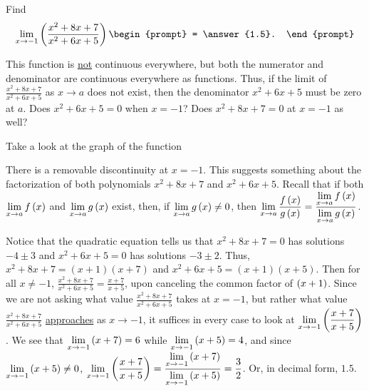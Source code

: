 \documentclass{ximera}
\author{Gregory Hartman \and Matthew Carr}
\begin{document}
\begin{exercise}



  Find 
  \[
  \lim_{x\to-1}\p{ \frac{x^2+8x+7}{x^2+6x+5}}
  \begin{prompt}
  = \answer{1.5}.
  \end{prompt}
  \]
    \begin{hint}
      This function is \underline{not} continuous everywhere, but both the numerator and denominator are continuous everywhere as functions. Thus, if the limit of $\frac{x^2+8x+7}{x^2+6x+5}$ as $x\to{a}$ does not exist, then the denominator $x^2+6x+5$ must be zero at $a$. Does $x^2+6x+5=0$ when $x=-1$? Does $x^2+8x+7=0$ at $x=-1$ as well?
    \end{hint}
     \begin{hint}
    Take a look at the graph of the function
    \begin{center}
      \end{center}
      There is a removable discontinuity at $x=-1$. This suggests something about the factorization of both polynomials $x^2+8x+7$ and $x^2+6x+5$. Recall that if both $\lim_{x\to a}f\p{x}$ and $\lim_{x\to a}g\p{x}$ exist, then, if $\lim_{x\to a}g\p{x}\ne0$, then $\lim_{x\to a}\frac{f\p{x}}{g\p{x}}=\frac{\lim_{x\to a}f\p{x}}{\lim_{x\to a}g\p{x}}$.
    \end{hint}
    \begin{hint}
     Notice that the quadratic equation tells us that $x^2+8x+7=0$ has solutions $-4\pm3$ and $x^2+6x+5=0$ has solutions $-3\pm{2}$. Thus, $x^2+8x+7=\left(x+1\right)\left(x+7\right)$ and $x^2+6x+5=\left(x+1\right)\left(x+5\right)$. Then for all $x\ne-1$, $\frac{x^2+8x+7}{x^2+6x+5}=\frac{x+7}{x+5}$, upon canceling the common factor of $\left(x+1\right)$. Since we are not asking what value $\frac{x^2+8x+7}{x^2+6x+5}$ takes at $x=-1$, but rather what value $\frac{x^2+8x+7}{x^2+6x+5}$ \underline{approaches} as $x\to-1$, it suffices in every case to look at $\lim_{x\to-1}\p{\frac{x+7}{x+5}}$. We see that $\lim_{x\to-1}\p{x+7}=6$ while $\lim_{x\to-1}\p{x+5}=4$, and since $\lim_{x\to-1}\p{x+5}\ne0$, $\lim_{x\to-1}\p{\frac{x+7}{x+5}}=\frac{\lim_{x\to-1}\p{x+7}}{\lim_{x\to-1}\p{x+5}}=\frac{3}{2}$. Or, in decimal form, $1.5$.
    \end{hint}
\end{exercise}
\end{document}
